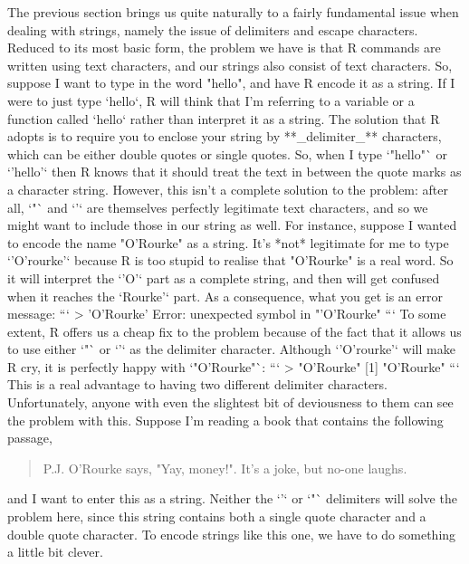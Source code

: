 The previous section brings us quite naturally to a fairly fundamental issue when dealing with strings, namely the issue of delimiters and escape characters. Reduced to its most basic form, the problem we have is that R commands are written using text characters, and our strings also consist of text characters. So, suppose I want to type in the word "hello", and have R encode it as a string. If I were to just type `hello`, R will think that I'm referring to a variable or a function called `hello` rather than interpret it as a string. The solution that R adopts is to require you to enclose your string by **_delimiter_** characters, which can be either double quotes or single quotes. So, when I type `"hello"` or `'hello'` then R knows that it should treat the text in between the quote marks as a character string. However, this isn't a complete solution to the problem: after all, `"` and `'` are themselves perfectly legitimate text characters, and so we might want to include those in our string as well. For instance, suppose I wanted to encode the name "O'Rourke" as a string. It's *not* legitimate for me to type `'O'rourke'` because R is too stupid to realise that "O'Rourke" is a real word. So it will interpret the `'O'` part as a complete string, and then will get confused when it reaches the `Rourke'` part. As a consequence, what you get is an error message:
```
> 'O'Rourke'
Error: unexpected symbol in "'O'Rourke"
```
To some extent, R offers us a cheap fix to the problem because of the fact that it allows us to use either `"` or `'` as the delimiter character. Although `'O'rourke'` will make R cry, it is perfectly happy with `"O'Rourke"`:
```
> "O'Rourke"
[1] "O'Rourke"
```
This is a real advantage to having two different delimiter characters. Unfortunately, anyone with even the slightest bit of deviousness to them can see the problem with this. Suppose I'm reading a book that contains the following passage,
\begin{quote}
P.J. O'Rourke says, "Yay, money!". It's a joke, but no-one laughs.
\end{quote}
and I want to enter this as a string. Neither the `'` or `"` delimiters will solve the problem here, since this string contains both a single quote character and a double quote character. To encode strings like this one, we have to do something a little bit clever. 

